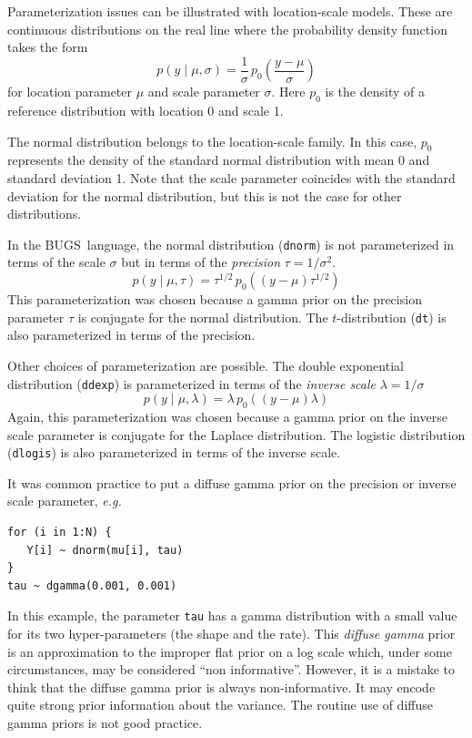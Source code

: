 \documentclass[11pt, a4paper, titlepage]{report}
\newcommand{\BUGS}{\textsf{BUGS}}
\begin{document}
Parameterization issues can be illustrated with location-scale models.
These are continuous distributions on the real line where the
probability density function takes the form
\[
p(y \mid \mu, \sigma) = \frac{1}{\sigma} \, p_0
\left(\frac{y - \mu}{\sigma}\right)
\]
for location parameter $\mu$ and scale parameter $\sigma$. Here $p_0$
is the density of a reference distribution with location 0 and scale
1.

The normal distribution belongs to the location-scale family. In this
case, $p_0$ represents the density of the standard normal distribution
with mean 0 and standard deviation 1. Note that the scale parameter
coincides with the standard deviation for the normal distribution, but
this is not the case for other distributions.

In the \BUGS\ language, the normal distribution (\texttt{dnorm}) is
not parameterized in terms of the scale $\sigma$ but in terms of the
{\em precision} $\tau = 1/\sigma^2$.
\[
p(y \mid \mu, \tau) = \tau^{1/2} \, p_0\left((y - \mu) \tau^{1/2}\right)
\]
This parameterization was chosen because a gamma prior on the
precision parameter $\tau$ is conjugate for the normal
distribution. The $t$-distribution (\texttt{dt}) is also parameterized
in terms of the precision.

Other choices of parameterization are possible. The double exponential
distribution (\texttt{ddexp}) is parameterized in terms of the {\em
  inverse scale} $\lambda=1/\sigma$
\[
p(y \mid \mu, \lambda) = \lambda \, p_0\left((y - \mu) \lambda \right)
\]
Again, this parameterization was chosen because a gamma prior on the
inverse scale parameter is conjugate for the Laplace distribution. The
logistic distribution (\texttt{dlogis}) is also parameterized in terms
of the inverse scale.

It was common practice to put a diffuse gamma prior on the precision
or inverse scale parameter, {\em e.g.}
\begin{verbatim}
for (i in 1:N) {
   Y[i] ~ dnorm(mu[i], tau)
}
tau ~ dgamma(0.001, 0.001)
\end{verbatim}
In this example, the parameter \texttt{tau} has a gamma distribution
with a small value for its two hyper-parameters (the shape and the
rate). This {\em diffuse gamma} prior is an approximation to the
improper flat prior on a log scale which, under some circumstances,
may be considered ``non informative''. However, it is a mistake to
think that the diffuse gamma prior is always non-informative. It may
encode quite strong prior information about the variance. The routine
use of diffuse gamma priors is not good practice.
\end{document}
